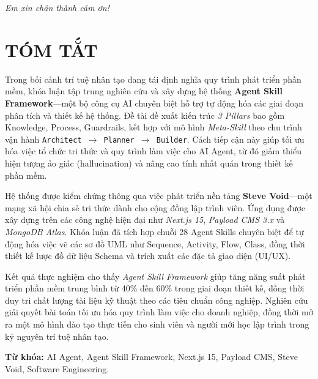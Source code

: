 \documentclass[13pt,a4paper,oneside]{extreport}
\numberwithin{equation}{chapter}
\numberwithin{figure}{chapter}
\numberwithin{table}{chapter}
\begin{document}
\begin{flushright}
  \textit{Em xin chân thành cảm ơn!}
\end{flushright}


\clearpage
\chapter*{TÓM TẮT}
Trong bối cảnh trí tuệ nhân tạo đang tái định nghĩa quy trình phát triển phần mềm, khóa luận tập trung nghiên cứu và xây dựng hệ thống \textbf{Agent Skill Framework}—một bộ công cụ AI chuyên biệt hỗ trợ tự động hóa các giai đoạn phân tích và thiết kế hệ thống. Đề tài đề xuất kiến trúc \textit{3 Pillars} bao gồm Knowledge, Process, Guardrails, kết hợp với mô hình \textit{Meta-Skill} theo chu trình vận hành \texttt{Architect $\rightarrow$ Planner $\rightarrow$ Builder}. Cách tiếp cận này giúp tối ưu hóa việc tổ chức tri thức và quy trình làm việc cho AI Agent, từ đó giảm thiểu hiện tượng ảo giác (hallucination) và nâng cao tính nhất quán trong thiết kế phần mềm.

Hệ thống được kiểm chứng thông qua việc phát triển nền tảng \textbf{Steve Void}—một mạng xã hội chia sẻ tri thức dành cho cộng đồng lập trình viên. Ứng dụng được xây dựng trên các công nghệ hiện đại như \textit{Next.js 15}, \textit{Payload CMS 3.x} và \textit{MongoDB Atlas}. Khóa luận đã tích hợp chuỗi 28 Agent Skills chuyên biệt để tự động hóa việc vẽ các sơ đồ UML như Sequence, Activity, Flow, Class, đồng thời thiết kế lược đồ dữ liệu Schema và trích xuất các đặc tả giao diện (UI/UX).

Kết quả thực nghiệm cho thấy \textit{Agent Skill Framework} giúp tăng năng suất phát triển phần mềm trung bình từ 40\% đến 60\% trong giai đoạn thiết kế, đồng thời duy trì chất lượng tài liệu kỹ thuật theo các tiêu chuẩn công nghiệp. Nghiên cứu giải quyết bài toán tối ưu hóa quy trình làm việc cho doanh nghiệp, đồng thời mở ra một mô hình đào tạo thực tiễn cho sinh viên và người mới học lập trình trong kỷ nguyên trí tuệ nhân tạo.

\textbf{Từ khóa:} AI Agent, Agent Skill Framework, Next.js 15, Payload CMS, Steve Void, Software Engineering.

\tableofcontents

\clearpage
\end{document}
